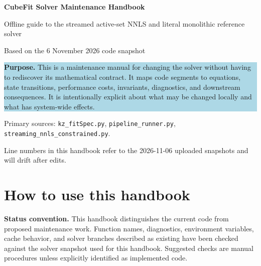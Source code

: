 \documentclass[10pt,a4paper]{article}
\newcommand{\file}[1]{\texttt{#1}}
\newenvironment{notebox}{\begin{leftbar}\small\color{navy}}{\end{leftbar}}
\begin{document}
\begin{titlepage}
\centering
\vspace*{25mm}
{\Huge\bfseries\color{navy} CubeFit Solver Maintenance Handbook\par}
\vspace{6mm}
{\Large Offline guide to the streamed active-set NNLS and literal monolithic reference solver\par}
\vspace{14mm}
{\large Based on the 6 November 2026 code snapshot\par}
\vfill
\begin{minipage}{0.84\textwidth}
\colorbox{lightblue}{\parbox{0.94\linewidth}{\vspace{3mm}\textbf{Purpose.} This is a maintenance manual for changing the solver without having to rediscover its mathematical contract. It maps code segments to equations, state transitions, performance costs, invariants, diagnostics, and downstream consequences. It is intentionally explicit about what may be changed locally and what has system-wide effects.\vspace{3mm}}}
\end{minipage}
\vfill
{\small Primary sources: \file{kz\_fitSpec.py}, \file{pipeline\_runner.py}, \file{streaming\_nnls\_constrained.py}.\par}
{\small Line numbers in this handbook refer to the 2026-11-06 uploaded snapshots and will drift after edits.\par}
\end{titlepage}

\tableofcontents
\newpage

\section{How to use this handbook}
\begin{notebox}
\textbf{Status convention.} This handbook distinguishes the current code from proposed maintenance work. Function names, diagnostics, environment variables, cache behavior, and solver branches described as existing have been checked against the solver snapshot used for this handbook. Suggested checks are manual procedures unless explicitly identified as implemented code.
\end{notebox}
\end{document}
